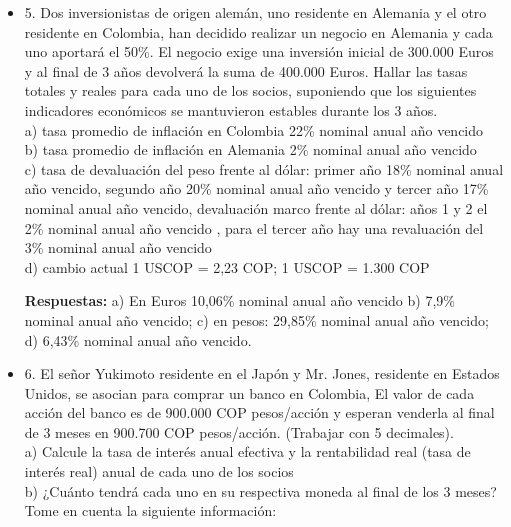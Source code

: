 \begin{itemize}
 \item 5. Dos  inversionistas  de  origen  alemán,  uno  residente  en  Alemania  y el  otro residente  en  Colombia,  han  decidido  realizar  un  negocio  en  Alemania  y cada uno aportará el 50\%. El negocio exige una inversión inicial de 300.000  Euros   y   al   final   de   3   años   devolverá   la   suma   de 400.000 Euros. Hallar las tasas totales y reales para cada uno de los socios, suponiendo  que  los  siguientes  indicadores  económicos  se  mantuvieron estables durante los 3 años.\\

       a) tasa promedio de inflación en Colombia 22\% nominal anual año vencido \\
       b) tasa promedio de inflación en Alemania 2\% nominal anual año vencido \\
       c) tasa  de  devaluación  del  peso  frente  al  dólar:  primer  año  18\% nominal anual año vencido, segundo  año  20\% nominal anual año vencido y  tercer  año  17\% nominal anual año vencido,  devaluación  marco frente  al  dólar:  años  1  y  2  el  2\% nominal anual año vencido ,  para  el  tercer  año  hay  una revaluación del 3\% nominal anual año vencido \\
       d) cambio actual 1 USCOP  =  2,23 COP; 1 USCOP = 1.300 COP

       \textbf{Respuestas:} a) En Euros 10,06\% nominal anual año vencido b) 7,9\% nominal anual año vencido; c) en pesos: 29,85\% nominal anual año vencido; d) 6,43\% nominal anual año vencido.\\
       \medskip

 \item 6. El señor Yukimoto residente en el Japón y Mr. Jones, residente en Estados Unidos,  se  asocian para comprar un banco en Colombia, El valor de cada acción del banco es de 900.000 COP pesos/acción y esperan venderla al final de 3 meses en 900.700 COP pesos/acción. (Trabajar con 5 decimales).\\

       a) Calcule la tasa de interés anual efectiva y la rentabilidad real (tasa de interés real) anual de cada uno de los socios\\
       b) ¿Cuánto tendrá cada uno en su respectiva moneda al final de los 3 meses? Tome en cuenta la siguiente información:\\


\end{itemize}
